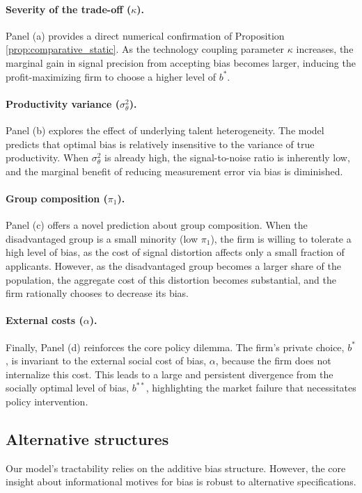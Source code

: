 \paragraph{Severity of the trade-off ($\kappa$).} Panel (a) provides a direct numerical confirmation of Proposition \ref{prop:comparative_static}. As the technology coupling parameter $\kappa$ increases, the marginal gain in signal precision from accepting bias becomes larger, inducing the profit-maximizing firm to choose a higher level of $b^*$.

\paragraph{Productivity variance ($\sigma^2_\theta$).} Panel (b) explores the effect of underlying talent heterogeneity. The model predicts that optimal bias is relatively insensitive to the variance of true productivity. When $\sigma^2_\theta$ is already high, the signal-to-noise ratio is inherently low, and the marginal benefit of reducing measurement error via bias is diminished.

\paragraph{Group composition ($\pi_1$).} Panel (c) offers a novel prediction about group composition. When the disadvantaged group is a small minority (low $\pi_1$), the firm is willing to tolerate a high level of bias, as the cost of signal distortion affects only a small fraction of applicants. However, as the disadvantaged group becomes a larger share of the population, the aggregate cost of this distortion becomes substantial, and the firm rationally chooses to decrease its bias.

\paragraph{External costs ($\alpha$).} Finally, Panel (d) reinforces the core policy dilemma. The firm's private choice, $b^*$, is invariant to the external social cost of bias, $\alpha$, because the firm does not internalize this cost. This leads to a large and persistent divergence from the socially optimal level of bias, $b^{**}$, highlighting the market failure that necessitates policy intervention.

\subsection{Alternative structures}
Our model's tractability relies on the additive bias structure. However, the core insight about informational motives for bias is robust to alternative specifications.

